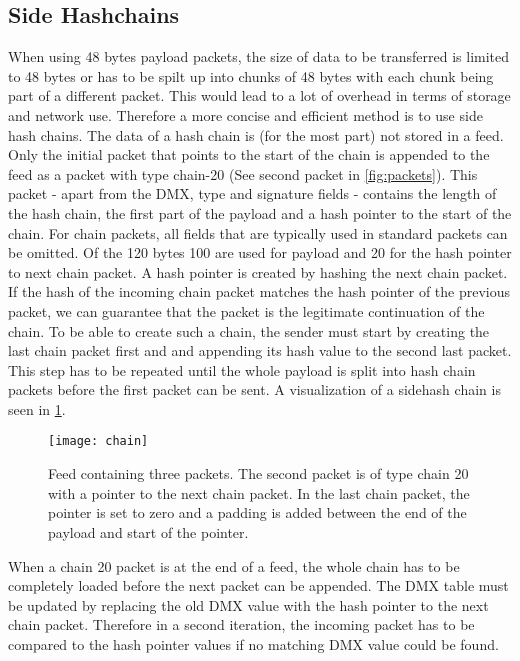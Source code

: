 \subsection{Side Hashchains}
When using 48 bytes payload packets, the size of data to be transferred is limited to 48 bytes or has to be spilt up into chunks of 48 bytes with each chunk being part of a different packet. This would lead to a lot of overhead in terms of storage and network use. Therefore a more concise and efficient method is to use side hash chains. The data of a hash chain is (for the most part) not stored in a feed. Only the initial packet that points to the start of the chain is appended to the feed as a packet with type chain-20 (See second packet in \cref{fig:packets}). This packet - apart from the DMX, type and signature fields - contains the length of the hash chain, the first part of the payload and a hash pointer to the start of the chain. For chain packets, all fields that are typically used in standard packets can be omitted. Of the 120 bytes 100 are used for payload and 20 for the hash pointer to next chain packet. A hash pointer is created by hashing the next chain packet. If the hash of the incoming chain packet matches the hash pointer of the previous packet, we can guarantee that the packet is the legitimate continuation of the chain. To be able to create such a chain, the sender must start by creating the last chain packet first and and appending its hash value to the second last packet. This step has to be repeated until the whole payload is split into hash chain packets before the first packet can be sent. A visualization of a sidehash chain is seen in \cref{fig:chain}. \\
\begin{figure}
\centering
\texttt{[image: chain]}
\caption{Feed containing three packets. The second packet is of type chain 20 with a pointer to the next chain packet. In the last chain packet, the pointer is set to zero and a padding is added between the end of the payload and start of the pointer.}
\label{fig:chain}
\end{figure}

When a chain 20 packet is at the end of a feed, the whole chain has to be completely loaded before the next packet can be appended. The DMX table must be updated by replacing the old DMX value with the hash pointer to the next chain packet. Therefore in a second iteration, the incoming packet has to be compared to the hash pointer values if no matching DMX value could be found. 

